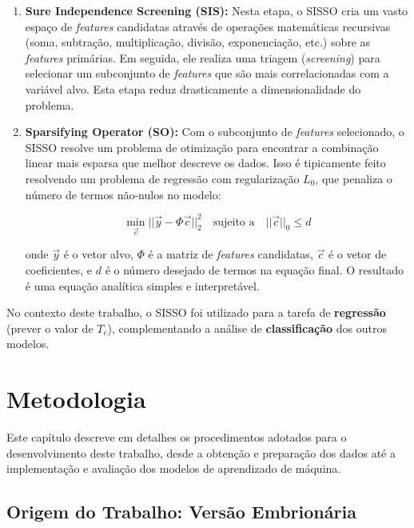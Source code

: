 \documentclass[12pt, a4paper, oneside]{report}
\begin{document}
\begin{enumerate}
    \item \textbf{Sure Independence Screening (SIS):} Nesta etapa, o SISSO cria um vasto espaço de \textit{features} candidatas através de operações matemáticas recursivas (soma, subtração, multiplicação, divisão, exponenciação, etc.) sobre as \textit{features} primárias. Em seguida, ele realiza uma triagem (\textit{screening}) para selecionar um subconjunto de \textit{features} que são mais correlacionadas com a variável alvo. Esta etapa reduz drasticamente a dimensionalidade do problema.
    
    \item \textbf{Sparsifying Operator (SO):} Com o subconjunto de \textit{features} selecionado, o SISSO resolve um problema de otimização para encontrar a combinação linear mais esparsa que melhor descreve os dados. Isso é tipicamente feito resolvendo um problema de regressão com regularização $L_0$, que penaliza o número de termos não-nulos no modelo:
    
    \begin{equation}
        \min_{\vec{c}} ||\vec{y} - \Phi \vec{c}||_2^2 \quad \text{sujeito a} \quad ||\vec{c}||_0 \le d
    \end{equation}
    
    onde $\vec{y}$ é o vetor alvo, $\Phi$ é a matriz de \textit{features} candidatas, $\vec{c}$ é o vetor de coeficientes, e $d$ é o número desejado de termos na equação final. O resultado é uma equação analítica simples e interpretável.
\end{enumerate}

No contexto deste trabalho, o SISSO foi utilizado para a tarefa de \textbf{regressão} (prever o valor de $T_c$), complementando a análise de \textbf{classificação} dos outros modelos.

\chapter{Metodologia}
\label{chap:metodologia}

Este capítulo descreve em detalhes os procedimentos adotados para o desenvolvimento deste trabalho, desde a obtenção e preparação dos dados até a implementação e avaliação dos modelos de aprendizado de máquina.

\section{Origem do Trabalho: Versão Embrionária}
\label{sec:versao_embrionaria}
\end{document}
